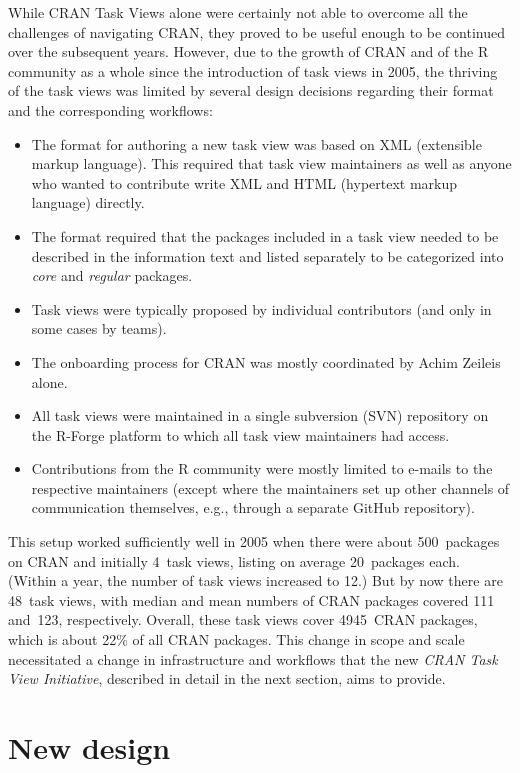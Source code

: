 While CRAN Task Views alone were certainly not able to overcome all the challenges of
navigating CRAN, they proved to be useful enough to be continued over the subsequent
years. However, due to the growth of CRAN \citep[see, e.g.,][]{cran} and of the R community as a whole
since the introduction of task views in 2005, the thriving of the task views
was limited by several design decisions regarding their format and the corresponding
workflows:

\begin{itemize}
\tightlist
\item
  The format for authoring a new task view was based on XML (extensible markup
  language). This required that task view maintainers as well as anyone who wanted to
  contribute write XML and HTML (hypertext markup language) directly.
\item
  The format required that the packages included in a task view needed to be
  described in the information text and listed separately to be categorized
  into \emph{core} and \emph{regular} packages.
\item
  Task views were typically proposed by individual contributors (and only in some cases
  by teams).
\item
  The onboarding process for CRAN was mostly coordinated by Achim Zeileis alone.
\item
  All task views were maintained in a single subversion (SVN) repository on the
  R-Forge platform \citep{rforge} to which all task view maintainers had access.
\item
  Contributions from the R community were mostly limited to e-mails to the respective
  maintainers (except where the maintainers set up other channels of communication
  themselves, e.g., through a separate GitHub repository).
\end{itemize}

This setup worked sufficiently well in 2005 when there were about 500~packages on CRAN and
initially 4~task views, listing on average 20~packages each. (Within a year, the
number of task views increased to 12.)
But by now there are 48~task views, with median and mean numbers of CRAN
packages covered 111 and~123, respectively.
Overall, these task views cover 4945~CRAN packages,
which is about 22\% of all CRAN packages.
This change in scope and scale necessitated a change in infrastructure and workflows
that the new \emph{CRAN Task View Initiative}, described in detail in the next section,
aims to provide.

\section{New design}\label{new-design}

